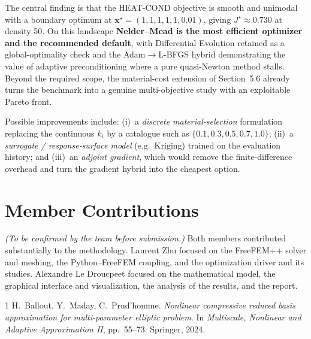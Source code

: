 \documentclass[11pt,a4paper]{article}
\begin{document}
The central finding is that the HEAT-COND objective is smooth and unimodal with a boundary optimum
at $\mathbf{x}^\star=(1,1,1,1,1,0.01)$, giving $J^\star\approx0.730$ at density 50. On this landscape
\textbf{Nelder--Mead is the most efficient optimizer and the recommended default}, with Differential
Evolution retained as a global-optimality check and the Adam$\rightarrow$L-BFGS hybrid demonstrating
the value of adaptive preconditioning where a pure quasi-Newton method stalls. Beyond the required
scope, the material-cost extension of Section~5.6 already turns the benchmark into a genuine
multi-objective study with an exploitable Pareto front.

Possible improvements include: (i)~a \emph{discrete material-selection} formulation replacing the
continuous $k_i$ by a catalogue such as $\{0.1,0.3,0.5,0.7,1.0\}$; (ii)~a \emph{surrogate /
response-surface model} (e.g.\ Kriging) trained on the evaluation history; and (iii)~an
\emph{adjoint gradient}, which would remove the finite-difference overhead and turn the gradient
hybrid into the cheapest option.

\section*{Member Contributions}
\emph{(To be confirmed by the team before submission.)} Both members contributed substantially to
the methodology. Laurent Zhu focused on the FreeFEM++ solver and meshing, the Python--FreeFEM
coupling, and the optimization driver and its studies. Alexandre Le Droucpeet focused on the
mathematical model, the graphical interface and visualization, the analysis of the results, and the
report.

\begin{thebibliography}{1}
 H.~Ballout, Y.~Maday, C.~Prud'homme.
\emph{Nonlinear compressive reduced basis approximation for multi-parameter elliptic problem}.
In \emph{Multiscale, Nonlinear and Adaptive Approximation II}, pp.~55--73. Springer, 2024.
\end{thebibliography}
\end{document}
